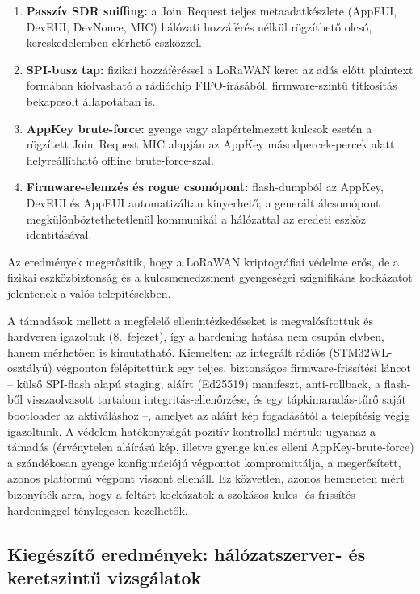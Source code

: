 \documentclass[12pt,a4paper]{article}
\begin{document}
\begin{enumerate}
    \item \textbf{Passzív SDR sniffing:} a Join~Request teljes metaadatkészlete
    (AppEUI, DevEUI, DevNonce, MIC) hálózati hozzáférés nélkül rögzíthető
    olcsó, kereskedelemben elérhető eszközzel.

    \item \textbf{SPI-busz tap:} fizikai hozzáféréssel a LoRaWAN keret az adás
    előtt plaintext formában kiolvasható a rádióchip FIFO-írásából, firmware-szintű
    titkosítás bekapcsolt állapotában is.

    \item \textbf{AppKey brute-force:} gyenge vagy alapértelmezett kulcsok esetén
    a rögzített Join~Request MIC alapján az AppKey másodpercek-percek alatt
    helyreállítható offline brute-force-szal.

    \item \textbf{Firmware-elemzés és rogue csomópont:} flash-dumpból az AppKey,
    DevEUI és AppEUI automatizáltan kinyerhető; a generált álcsomópont
    megkülönböztethetetlenül kommunikál a hálózattal az eredeti eszköz identitásával.
\end{enumerate}

Az eredmények megerősítik, hogy a LoRaWAN kriptográfiai védelme erős, de
a fizikai eszközbiztonság és a kulcsmenedzsment gyengeségei szignifikáns
kockázatot jelentenek a valós telepítésekben.

A támadások mellett a megfelelő ellenintézkedéseket is megvalósítottuk és
hardveren igazoltuk (8.\ fejezet), így a hardening hatása nem csupán elvben,
hanem mérhetően is kimutatható. Kiemelten: az integrált rádiós
(STM32WL-osztályú) végponton felépítettünk egy teljes, biztonságos
firmware-frissítési láncot -- külső SPI-flash alapú staging, aláírt (Ed25519)
manifeszt, anti-rollback, a flash-ből visszaolvasott tartalom
integritás-ellenőrzése, és egy tápkimaradás-tűrő saját bootloader az
aktiváláshoz --, amelyet az aláírt kép fogadásától a telepítésig végig
igazoltunk. A védelem hatékonyságát pozitív kontrollal mértük: ugyanaz a támadás
(érvénytelen aláírású kép, illetve gyenge kulcs elleni AppKey-brute-force) a
szándékosan gyenge konfigurációjú végpontot kompromittálja, a megerősített,
azonos platformú végpont viszont ellenáll. Ez közvetlen, azonos bemeneten mért
bizonyíték arra, hogy a feltárt kockázatok a szokásos kulcs- és
frissítés-hardeninggel ténylegesen kezelhetők.

\subsection{Kiegészítő eredmények: hálózatszerver- és keretszintű vizsgálatok}
\end{document}
